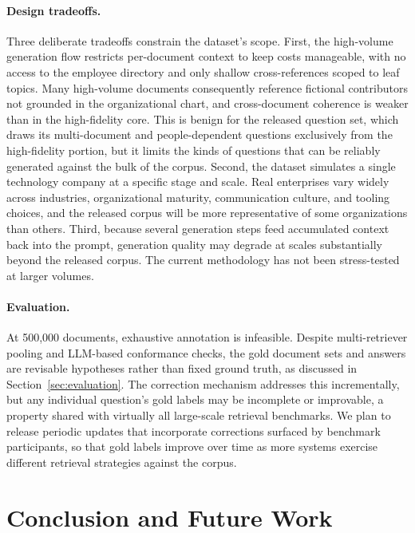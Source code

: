 \documentclass{article}
\begin{document}
\paragraph{Design tradeoffs.}
Three deliberate tradeoffs constrain the dataset's scope. First, the high-volume generation flow restricts per-document context to keep costs manageable, with no access to the employee directory and only shallow cross-references scoped to leaf topics. Many high-volume documents consequently reference fictional contributors not grounded in the organizational chart, and cross-document coherence is weaker than in the high-fidelity core. This is benign for the released question set, which draws its multi-document and people-dependent questions exclusively from the high-fidelity portion, but it limits the kinds of questions that can be reliably generated against the bulk of the corpus. Second, the dataset simulates a single technology company at a specific stage and scale. Real enterprises vary widely across industries, organizational maturity, communication culture, and tooling choices, and the released corpus will be more representative of some organizations than others. Third, because several generation steps feed accumulated context back into the prompt, generation quality may degrade at scales substantially beyond the released corpus. The current methodology has not been stress-tested at larger volumes.

\paragraph{Evaluation.}
At 500,000 documents, exhaustive annotation is infeasible. Despite multi-retriever pooling and LLM-based conformance checks, the gold document sets and answers are revisable hypotheses rather than fixed ground truth, as discussed in Section~\ref{sec:evaluation}. The correction mechanism addresses this incrementally, but any individual question's gold labels may be incomplete or improvable, a property shared with virtually all large-scale retrieval benchmarks. We plan to release periodic updates that incorporate corrections surfaced by benchmark participants, so that gold labels improve over time as more systems exercise different retrieval strategies against the corpus.

\section{Conclusion and Future Work}
\label{sec:conclusion}
\end{document}
